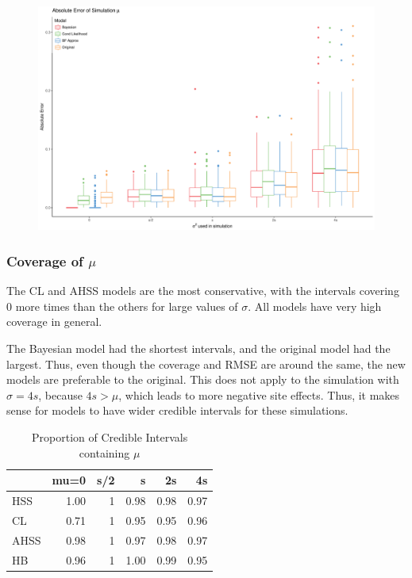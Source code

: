 \documentclass[AMA,STIX1COL]{WileyNJD-v2}\usepackage[]{graphicx}\usepackage[]{color}
\newenvironment{knitrout}{}{} %
\begin{document}
\begin{figure}
\begin{knitrout}
\color{fgcolor}

{\centering \includegraphics[width=6in]{figure/unnamed-chunk-21-1} 

}



\end{knitrout}
\end{figure}

\subsubsection{Coverage of $\mu$}

The CL and AHSS models are the most conservative, with the intervals covering 0 more times than the  others for large values of $\sigma$. All models have very high coverage in general.

The Bayesian model had the shortest intervals, and the original model had the largest. Thus, even though the coverage and RMSE are around the same, the new models are preferable to the original. This does not apply to the simulation with $\sigma=4s$, because $4s>\mu$, which leads to more negative site effects. Thus, it makes sense for models to have wider credible intervals for these simulations. 


\begin{knitrout}
\color{fgcolor}\begin{table}

\caption{\label{tab:unnamed-chunk-22}Proportion of Credible Intervals containing $\mu$}
\centering
\begin{tabular}[t]{l|r|r|r|r|r}
\hline
  & mu=0 & s/2 & s & 2s & 4s\\
\hline
HSS & 1.00 & 1 & 0.98 & 0.98 & 0.97\\
\hline
CL & 0.71 & 1 & 0.95 & 0.95 & 0.96\\
\hline
AHSS & 0.98 & 1 & 0.97 & 0.98 & 0.97\\
\hline
HB & 0.96 & 1 & 1.00 & 0.99 & 0.95\\
\hline
\end{tabular}
\end{table}


\end{knitrout}
\end{document}
